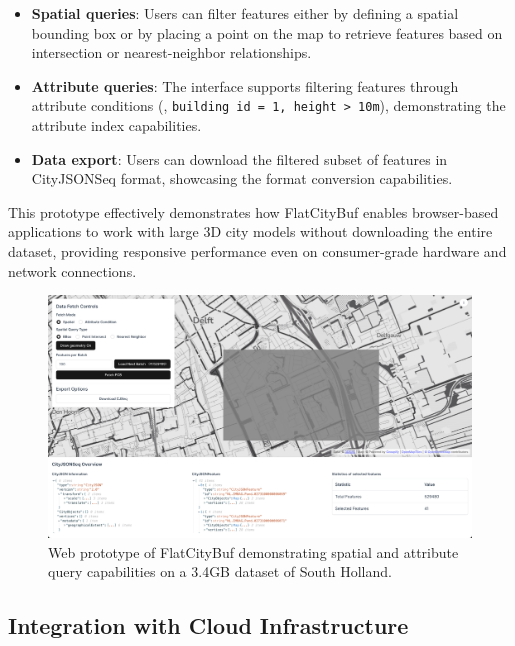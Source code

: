 \begin{itemize}
  \item \textbf{Spatial queries}: Users can filter features either by defining a spatial bounding box or by placing a point on the map to retrieve features based on intersection or nearest-neighbor relationships.

  \item \textbf{Attribute queries}: The interface supports filtering features through attribute conditions (\eg, \texttt{building id = 1, height > 10m}), demonstrating the attribute index capabilities.

  \item \textbf{Data export}: Users can download the filtered subset of features in CityJSONSeq format, showcasing the format conversion capabilities.
\end{itemize}

This prototype effectively demonstrates how FlatCityBuf enables browser-based applications to work with large 3D city models without downloading the entire dataset, providing responsive performance even on consumer-grade hardware and network connections.

\begin{figure}[ht]
  \centering
  \includegraphics[width=1.0\textwidth]{figs/result_analysis/web_prototype.png}
  \caption{Web prototype of FlatCityBuf demonstrating spatial and attribute query capabilities on a 3.4GB dataset of South Holland.}
  \label{fig:result:cross_platform_implementation:web_prototype}
\end{figure}

\subsection{Integration with Cloud Infrastructure}
\label{result:cross_platform_implementation:cloud_integration}

